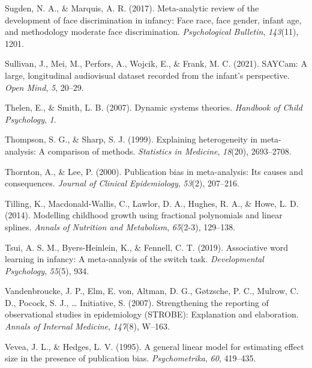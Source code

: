 \documentclass[
  man]{apa6}
\newlength{\cslhangindent}
\newlength{\cslentryspacingunit} %
\newenvironment{CSLReferences}[2] %
 {%
  \setlength{\parindent}{0pt}
  \ifodd #1
  \let\oldpar\par
  \def\par{\hangindent=\cslhangindent\oldpar}
  \fi
  \setlength{\parskip}{#2\cslentryspacingunit}
 }%
 {}
\begin{document}
\begin{CSLReferences}{1}{0}
\leavevmode{}%
Sugden, N. A., \& Marquis, A. R. (2017). Meta-analytic review of the development of face discrimination in infancy: Face race, face gender, infant age, and methodology moderate face discrimination. \emph{Psychological Bulletin}, \emph{143}(11), 1201.

\leavevmode{}%
Sullivan, J., Mei, M., Perfors, A., Wojcik, E., \& Frank, M. C. (2021). SAYCam: A large, longitudinal audiovisual dataset recorded from the infant's perspective. \emph{Open Mind}, \emph{5}, 20--29.

\leavevmode{}%
Thelen, E., \& Smith, L. B. (2007). Dynamic systems theories. \emph{Handbook of Child Psychology}, \emph{1}.

\leavevmode{}%
Thompson, S. G., \& Sharp, S. J. (1999). Explaining heterogeneity in meta-analysis: A comparison of methods. \emph{Statistics in Medicine}, \emph{18}(20), 2693--2708.

\leavevmode{}%
Thornton, A., \& Lee, P. (2000). Publication bias in meta-analysis: Its causes and consequences. \emph{Journal of Clinical Epidemiology}, \emph{53}(2), 207--216.

\leavevmode{}%
Tilling, K., Macdonald-Wallis, C., Lawlor, D. A., Hughes, R. A., \& Howe, L. D. (2014). Modelling childhood growth using fractional polynomials and linear splines. \emph{Annals of Nutrition and Metabolism}, \emph{65}(2-3), 129--138.

\leavevmode{}%
Tsui, A. S. M., Byers-Heinlein, K., \& Fennell, C. T. (2019). Associative word learning in infancy: A meta-analysis of the switch task. \emph{Developmental Psychology}, \emph{55}(5), 934.

\leavevmode{}%
Vandenbroucke, J. P., Elm, E. von, Altman, D. G., Gøtzsche, P. C., Mulrow, C. D., Pocock, S. J., \ldots{} Initiative, S. (2007). Strengthening the reporting of observational studies in epidemiology (STROBE): Explanation and elaboration. \emph{Annals of Internal Medicine}, \emph{147}(8), W--163.

\leavevmode{}%
Vevea, J. L., \& Hedges, L. V. (1995). A general linear model for estimating effect size in the presence of publication bias. \emph{Psychometrika}, \emph{60}, 419--435.


\end{CSLReferences}
\end{document}

